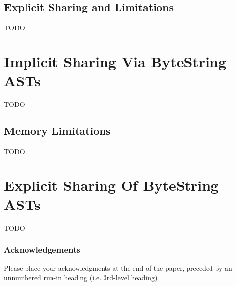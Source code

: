 \documentclass[runningheads]{llncs}
\begin{document}
\subsection{Explicit Sharing and Limitations}
TODO

\section{Implicit Sharing Via ByteString ASTs}
TODO

\subsection{Memory Limitations}
TODO
\section{Explicit Sharing Of ByteString ASTs}
TODO

\subsubsection{Acknowledgements} Please place your acknowledgments at
the end of the paper, preceded by an unnumbered run-in heading (i.e.
3rd-level heading).

%
%


\end{document}
